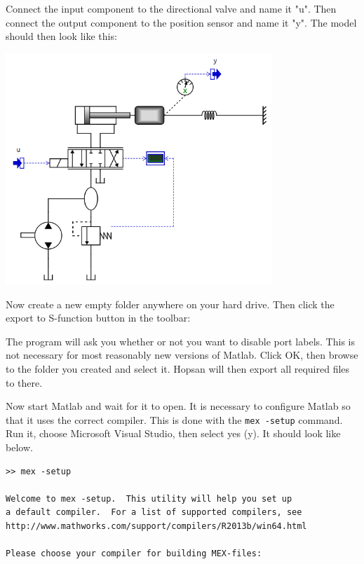 \documentclass[a4paper]{article}
\begin{document}
\begin{enumerate}
Connect the input component to the directional valve and name it "u".
Then connect the output component to the position sensor and name it "y".
The model should then look like this:

\includegraphics[height=8.73753cm]{gfx/simulink/model3.png}

Now create a new empty folder anywhere on your hard drive. Then click the export to S-function button in the toolbar:


The program will ask you whether or not you want to disable port labels.
This is not necessary for most reasonably new versions of Matlab. 
Click OK, then browse to the folder you created and select it. 
Hopsan will then export all required files to there.

Now start Matlab and wait for it to open. 
It is necessary to configure Matlab so that it uses the correct compiler. 
This is done with the \texttt{mex -setup} command. 
Run it, choose Microsoft Visual Studio, then select yes (y). 
It should look like below. 

\lstset{
    breaklines     = true,
    basicstyle	   = \footnotesize\ttfamily
}
\begin{lstlisting}
>> mex -setup
 
Welcome to mex -setup.  This utility will help you set up  
a default compiler.  For a list of supported compilers, see  
http://www.mathworks.com/support/compilers/R2013b/win64.html 
 
Please choose your compiler for building MEX-files: 
 

\end{lstlisting}
\end{enumerate}
\end{document}
